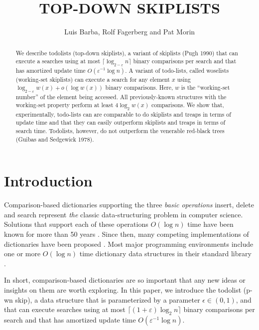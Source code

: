 \documentclass[lotsofwhite]{patmorin}
\title{\MakeUppercase{Top-Down Skiplists}}
\author{Luis Barba, Rolf Fagerberg and Pat Morin}
\newcommand{\eps}{\varepsilon}
\begin{document}
\begin{titlepage}
\maketitle

\begin{abstract}
  We describe todolists (top-down skiplists), a variant of skiplists (Pugh
  1990) that can execute a searches using at most $\lceil\log_{2-\eps}
  n\rceil$ binary comparisons per search and that has amortized update
  time $O(\eps^{-1}\log n)$.  A variant of todo-lists, called woselists
  (working-set skiplists) can execute a search for any element $x$
  using $\log_{2-\eps} w(x) + o(\log w(x))$ binary comparisons.  Here,
  $w$ is the ``working-set number'' of the element being accessed.
  All previously-known structures with the working-set property perform
  at least $4\log_2 w(x)$ comparisons.  We show that, experimentally,
  todo-lists can are comparable to do skiplists and treaps in terms of
  update time and that they can easily outperform skiplists and treaps
  in terms of search time.  Todolists, however, do not outperform the
  venerable red-black trees (Guibas and Sedgewick 1978).
\end{abstract}

\end{titlepage}

\section{Introduction}

Comparison-based dictionaries supporting the three \emph{basic operations}
insert, delete and search represent \emph{the} classic data-structuring
problem in computer science.  Solutions that support each of these
operations $O(\log n)$ time have been known for more than 50 years
\cite{avl}.  Since then, many competing implementations of dictionaries
have been proposed \cite{X}.  Most major programming environments include
one or more $O(\log n)$ time dictionary data structures in their standard
library \cite{S}.

In short, comparison-based dictionaries are so important that any
new ideas or insights on them are worth exploring.  In this paper,
we introduce the todolist (p-wn skip), a
data structure that is parameterized by a parameter $\epsilon\in(0,1)$,
and that can execute searches using at most $\lceil(1+\eps)\log_2
n\rceil$ binary comparisons per search and that has amortized update
time $O(\eps^{-1}\log n)$.
\end{document}
